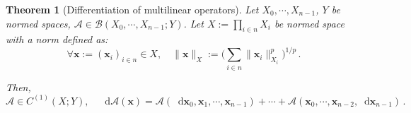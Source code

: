 \documentclass[openany]{book}
\theoremstyle{plain}
\newtheorem{theorem}{Theorem}[section] %
\theoremstyle{definition}
\newcommand{\dif}{\mathop{}\!\mathrm{d}} %
\newcommand*{\bv}{\boldsymbol} %
\begin{document}
\begin{theorem}[Differentiation of multilinear operators]
	Let $X_0, \cdots, X_{n - 1}$, $Y$ be normed spaces, $\mathscr A \in \mathcal B(X_0, \cdots, X_{n - 1}; Y)$. 
	Let $X := \prod_{i \in n} X_i$ be normed space with a norm defined as:
	\begin{equation}\label{equation: norm of product space}
		\forall \bv x := (\bv x_i)_{i \in n} \in X, \quad
		\|\bv x\|_X := \Big( \sum_{i \in n} \|\bv x_i\|_{X_i}^p \Big)^{1/p}\,.
	\end{equation}

	Then, 
	\begin{equation*}
		\mathscr A \in C^{(1)}(X; Y),\quad
		\dif \mathscr A (\bv x) = \mathscr A(\dif \bv x_0, \bv x_1, \cdots, \bv x_{n - 1}) + \cdots + \mathscr A(\bv x_0, \cdots, \bv x_{n-2}, \dif \bv x_{n-1})\,.
	\end{equation*}
\end{theorem}
\end{document}
